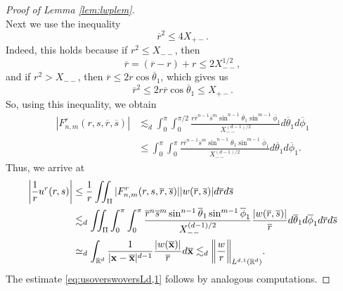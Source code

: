\documentclass[11pt]{amsart}
\theoremstyle{definition}
\theoremstyle{remark}
\numberwithin{equation}{section}
\numberwithin{equation}{section}
\newcommand{\br}[1]{\overline{#1}}
\newcommand{\0}{\emptyset}
\newcommand{\tht}{\theta}
\newcommand{\bfx}{{\bf x}}
\newcommand{\bbR}{\mathbb R}
\begin{document}
\begin{proof}[Proof of Lemma \ref{lem:lwplem}]
\begin{equation}
\end{equation}
Next we use the inequality
\begin{equation}
\br{r}^{2}\leq 4X_{+-}.
\end{equation}
Indeed, this holds because if $r^{2}\leq X_{--}$, then $$ \br{r}=(\br{r}-r)+r\leq 2X_{--}^{1/2}, $$ and if $r^{2}> X_{--}$, then $ \br{r}\leq 2r\cos\br{\tht}_{1} $, which gives us $$ \br{r}^{2}\leq 2r\br{r}\cos\br{\tht}_{1}\leq X_{+-}. $$
So, using this inequality, we obtain
\begin{equation}
\begin{aligned}
|F_{n,m}^{r}(r,s,\br{r},\br{s})|&\lesssim_{d}  \int_{0}^{\pi}\int_{0}^{\pi/2}%
				\frac{r\br{r}^{n-1}\br{s}^{m}\sin^{n-1}\br{\tht}_{1}\sin^{m-1}\br{\phi}_{1}}{X_{--}^{(d-1)/2}}d\br{\tht}_{1}d\br{\phi}_{1}\\
&\leq \int_{0}^{\pi}\int_{0}^{\pi}\frac{r\br{r}^{n-1}\br{s}^{m}\sin^{n-1}\br{\tht}_{1}\sin^{m-1}\br{\phi}_{1}}{X_{--}^{(d-1)/2}}d\br{\tht}_{1}d\br{\phi}_{1}.
\end{aligned}
\end{equation}
Thus, we arrive at 
\begin{equation}
\begin{aligned}
\bigg|\frac{1}{r}u^{r}(r,s)\bigg|&\leq \frac{1}{r}\iint_{\Pi}|F_{n,m}^{r}(r,s,\br{r},\br{s})||w(\br{r},\br{s})|d\br{r}d\br{s}\\
&\lesssim_{d} \iint_{\Pi}\int_{0}^{\pi}\int_{0}^{\pi}\frac{\br{r}^{n}\br{s}^{m}\sin^{n-1}\br{\tht}_{1}\sin^{m-1}\br{\phi}_{1}}{X_{--}^{(d-1)/2}}\frac{|w(\br{r},\br{s})|}{\br{r}}d\br{\tht}_{1}d\br{\phi}_{1}d\br{r}d\br{s}\\
&\simeq_{d} \int_{\bbR^{d}}\frac{1}{|\bfx-\br{\bfx}|^{d-1}}\frac{|w(\br{\bfx})|}{\br{r}}d\br{\bfx}\lesssim_{d} \bigg\| \frac{w}{r}\bigg\|_{L^{d,1}(\bbR^{d})}.
\end{aligned}
\end{equation}
The estimate \eqref{eq:usoverswoversLd,1} follows by analogous computations.

\end{proof}
\end{document}
